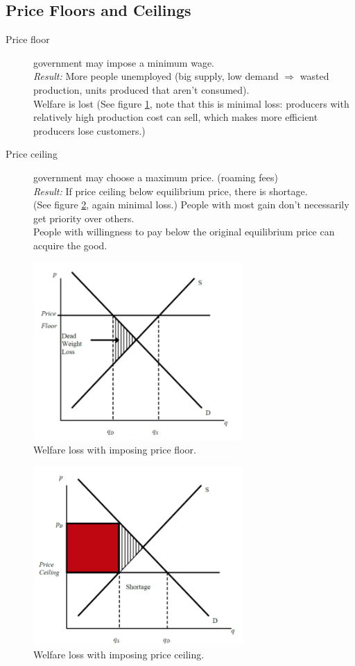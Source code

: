 \documentclass[12pt, a4paper, titlepage]{extarticle}
\begin{document}
	\subsection{Price Floors and Ceilings}
	\begin{description}
		\item[Price floor] government may impose a minimum wage.\\
		\textit{Result:} More people unemployed (big supply, low demand $\Rightarrow$ wasted production, units produced that aren't consumed).\\ Welfare is lost (See figure \ref{imgPriceFloor}, note that this is minimal loss: producers with relatively high production cost can sell, which makes more efficient producers lose customers.)
		\item[Price ceiling] government may choose a maximum price. (roaming fees)\\
		\textit{Result:} If price ceiling below equilibrium price, there is shortage.\\ (See figure \ref{imgPriceCeiling}, again minimal loss.) People with most gain don't necessarily get priority over others. \\ People with willingness to pay below the original equilibrium price can acquire the good.
	\end{description}
	\begin{figure}[h]
	\centering
		\includegraphics[width=8cm]{PriceFloor}	
		\caption{Welfare loss with imposing price floor. \label{imgPriceFloor}}
	\end{figure}
	\begin{figure}[h]
	\centering
		\includegraphics[width=8cm]{PriceCeiling}
		\caption{Welfare loss with imposing price ceiling. \label{imgPriceCeiling}}
	\end{figure}
	
\end{document}
